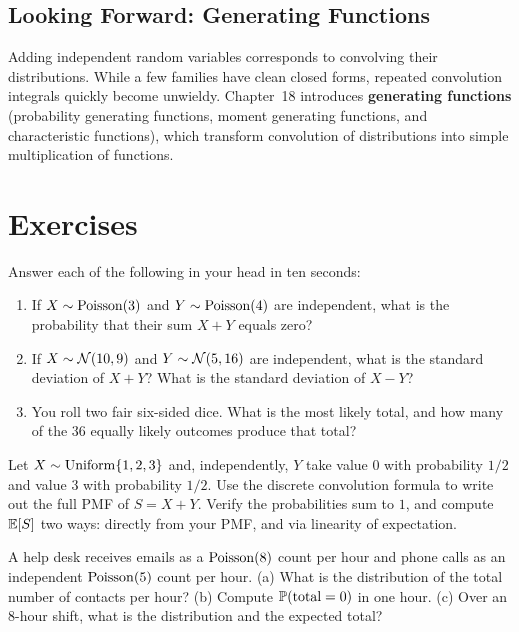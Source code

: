 \subsection*{Looking Forward: Generating Functions}

Adding independent random variables corresponds to convolving their distributions.
While a few families have clean closed forms, repeated convolution integrals quickly
become unwieldy. Chapter~18 introduces \textbf{generating functions} (probability generating
functions, moment generating functions, and characteristic functions), which transform
convolution of distributions into simple multiplication of functions.

\section{Exercises}
\label{ch17:exercises}

\begin{exercise}
\label{ch17:ex-warmup}
Answer each of the following in your head in ten seconds:
\begin{enumerate}[label=(\alph*)]
  \item If $X \sim \Pois(3)$ and $Y \sim \Pois(4)$ are independent, what is
        the probability that their sum $X+Y$ equals zero?
  \item If $X \sim \Normal(10, 9)$ and $Y \sim \Normal(5, 16)$ are
        independent, what is the standard deviation of $X+Y$? What is the
        standard deviation of $X-Y$?
  \item You roll two fair six-sided dice. What is the most likely total, and
        how many of the $36$ equally likely outcomes produce that total?
\end{enumerate}
\end{exercise}

\begin{exercise}
\label{ch17:ex-byhand}
Let $X\sim\Unif\set{1,2,3}$ and, independently, $Y$ take value $0$ with
probability $1/2$ and value $3$ with probability $1/2$. Use the discrete
convolution formula to write out the full PMF of $S=X+Y$. Verify the
probabilities sum to $1$, and compute $\E[S]$ two ways: directly from your
PMF, and via linearity of expectation.
\end{exercise}

\begin{exercise}
\label{ch17:ex-pois}
A help desk receives emails as a $\Pois(8)$ count per hour and phone calls
as an independent $\Pois(5)$ count per hour.
(a) What is the distribution of the total number of contacts per hour?
(b) Compute $\P(\text{total}=0)$ in one hour.
(c) Over an $8$-hour shift, what is the distribution and the expected total?
\end{exercise}

